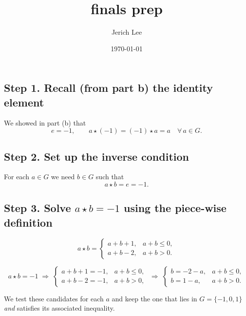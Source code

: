 \documentclass[12pt]{article}
\title{finals prep}
\author{Jerich Lee}
\date{\today}
\theoremstyle{definition} %
\theoremstyle{plain} %
\begin{document}
\maketitle

\subsection*{Step 1.  Recall (from part b) the identity element}

We showed in part (b) that
\[
e=-1,
\qquad
a\star(-1)=(-1)\star a=a\quad\forall\,a\in G.
\]

\subsection*{Step 2.  Set up the inverse condition}

For each \(a\in G\) we need \(b\in G\) such that
\[
a\star b = e = -1 .
\]

\subsection*{Step 3.  Solve \(a\star b=-1\) using the
piece-wise definition}

\[
a\star b =
\begin{cases}
a+b+1, & a+b \le 0,\\
a+b-2, & a+b > 0 .
\end{cases}
\]

\[
a\star b = -1 \;\Longrightarrow\;
\begin{cases}
a+b+1 = -1, & a+b \le 0,\\
a+b-2 = -1, & a+b > 0,
\end{cases}
\;\Longrightarrow\;
\begin{cases}
b = -2-a, & a+b \le 0,\\
b = 1-a,  & a+b > 0.
\end{cases}
\]

We test these candidates for each \(a\) and keep the one that lies in
\(G=\{-1,0,1\}\) \emph{and} satisfies its associated inequality.
\end{document}
